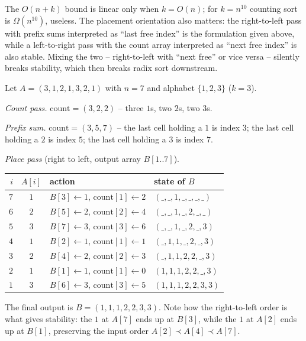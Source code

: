 \begin{remark}
The $O(n + k)$ bound is linear only when $k = O(n)$; for $k = n^{10}$ counting sort is $\Omega(n^{10})$, useless. The placement orientation also matters: the right-to-left pass with prefix sums interpreted as ``last free index'' is the formulation given above, while a left-to-right pass with the count array interpreted as ``next free index'' is also stable. Mixing the two -- right-to-left with ``next free'' or vice versa -- silently breaks stability, which then breaks radix sort downstream.
\end{remark}

\begin{example}
\label{ex:counting_sort_run}
Let $A = (3, 1, 2, 1, 3, 2, 1)$ with $n = 7$ and alphabet $\{1, 2, 3\}$ ($k = 3$).

\medskip
\noindent\textit{Count pass.} $\mathrm{count} = (3, 2, 2)$ -- three $1$s, two $2$s, two $3$s.

\medskip
\noindent\textit{Prefix sum.} $\mathrm{count} = (3, 5, 7)$ -- the last cell holding a $1$ is index $3$; the last cell holding a $2$ is index $5$; the last cell holding a $3$ is index $7$.

\medskip
\noindent\textit{Place pass} (right to left, output array $B[1..7]$).
\begin{center}
\begin{tabular}{rcll}
\toprule
$i$ & $A[i]$ & action & state of $B$ \\
\midrule
$7$ & $1$ & $B[3] \gets 1$, $\mathrm{count}[1] \gets 2$ & $(\_,\_,1,\_,\_,\_,\_)$ \\
$6$ & $2$ & $B[5] \gets 2$, $\mathrm{count}[2] \gets 4$ & $(\_,\_,1,\_,2,\_,\_)$ \\
$5$ & $3$ & $B[7] \gets 3$, $\mathrm{count}[3] \gets 6$ & $(\_,\_,1,\_,2,\_,3)$ \\
$4$ & $1$ & $B[2] \gets 1$, $\mathrm{count}[1] \gets 1$ & $(\_,1,1,\_,2,\_,3)$ \\
$3$ & $2$ & $B[4] \gets 2$, $\mathrm{count}[2] \gets 3$ & $(\_,1,1,2,2,\_,3)$ \\
$2$ & $1$ & $B[1] \gets 1$, $\mathrm{count}[1] \gets 0$ & $(1,1,1,2,2,\_,3)$ \\
$1$ & $3$ & $B[6] \gets 3$, $\mathrm{count}[3] \gets 5$ & $(1,1,1,2,2,3,3)$ \\
\bottomrule
\end{tabular}
\end{center}
The final output is $B = (1,1,1,2,2,3,3)$. Note how the right-to-left order is what gives stability: the $1$ at $A[7]$ ends up at $B[3]$, while the $1$ at $A[2]$ ends up at $B[1]$, preserving the input order $A[2] \prec A[4] \prec A[7]$.
\end{example}

